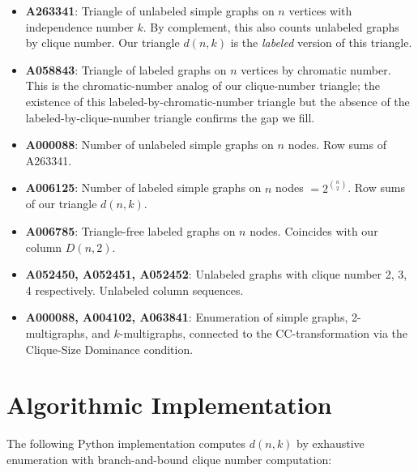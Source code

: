 \documentclass[11pt,a4paper]{article}
\theoremstyle{definition}
\begin{document}
\begin{itemize}
\item \textbf{A263341}: Triangle of unlabeled simple graphs on $n$ vertices with independence number $k$. By complement, this also counts unlabeled graphs by clique number. Our triangle $d(n,k)$ is the \emph{labeled} version of this triangle.
\item \textbf{A058843}: Triangle of labeled graphs on $n$ vertices by chromatic number. This is the chromatic-number analog of our clique-number triangle; the existence of this labeled-by-chromatic-number triangle but the absence of the labeled-by-clique-number triangle confirms the gap we fill.
\item \textbf{A000088}: Number of unlabeled simple graphs on $n$ nodes. Row sums of A263341.
\item \textbf{A006125}: Number of labeled simple graphs on $n$ nodes $= 2^{\binom{n}{2}}$. Row sums of our triangle $d(n,k)$.
\item \textbf{A006785}: Triangle-free labeled graphs on $n$ nodes. Coincides with our column $D(n,2)$.
\item \textbf{A052450, A052451, A052452}: Unlabeled graphs with clique number 2, 3, 4 respectively. Unlabeled column sequences.
\item \textbf{A000088, A004102, A063841}: Enumeration of simple graphs, 2-multigraphs, and $k$-multigraphs, connected to the CC-transformation via the Clique-Size Dominance condition.
\end{itemize}

\section{Algorithmic Implementation}

The following Python implementation computes $d(n, k)$ by exhaustive enumeration with branch-and-bound clique number computation:
\end{document}

